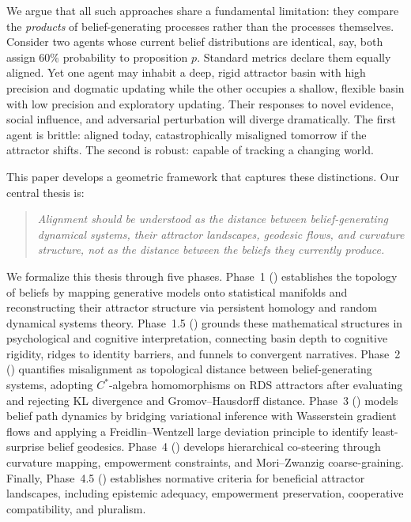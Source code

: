 \documentclass[11pt,a4paper]{article}
\theoremstyle{definition}
\begin{document}
We argue that all such approaches share a fundamental limitation: they compare the \emph{products} of belief-generating processes rather than the processes themselves. Consider two agents whose current belief distributions are identical, say, both assign 60\% probability to proposition $p$. Standard metrics declare them equally aligned. Yet one agent may inhabit a deep, rigid attractor basin with high precision and dogmatic updating while the other occupies a shallow, flexible basin with low precision and exploratory updating. Their responses to novel evidence, social influence, and adversarial perturbation will diverge dramatically. The first agent is brittle: aligned today, catastrophically misaligned tomorrow if the attractor shifts. The second is robust: capable of tracking a changing world.

This paper develops a geometric framework that captures these distinctions. Our central thesis is:
\begin{quote}
\emph{Alignment should be understood as the distance between belief-generating dynamical systems, their attractor landscapes, geodesic flows, and curvature structure, not as the distance between the beliefs they currently produce.}
\end{quote}

We formalize this thesis through five phases. Phase~1 () establishes the topology of beliefs by mapping generative models onto statistical manifolds and reconstructing their attractor structure via persistent homology and random dynamical systems theory. Phase~1.5 () grounds these mathematical structures in psychological and cognitive interpretation, connecting basin depth to cognitive rigidity, ridges to identity barriers, and funnels to convergent narratives. Phase~2 () quantifies misalignment as topological distance between belief-generating systems, adopting $C^*$-algebra homomorphisms on RDS attractors after evaluating and rejecting KL divergence and Gromov--Hausdorff distance. Phase~3 () models belief path dynamics by bridging variational inference with Wasserstein gradient flows and applying a Freidlin--Wentzell large deviation principle to identify least-surprise belief geodesics. Phase~4 () develops hierarchical co-steering through curvature mapping, empowerment constraints, and Mori--Zwanzig coarse-graining. Finally, Phase~4.5 () establishes normative criteria for beneficial attractor landscapes, including epistemic adequacy, empowerment preservation, cooperative compatibility, and pluralism.
\end{document}
